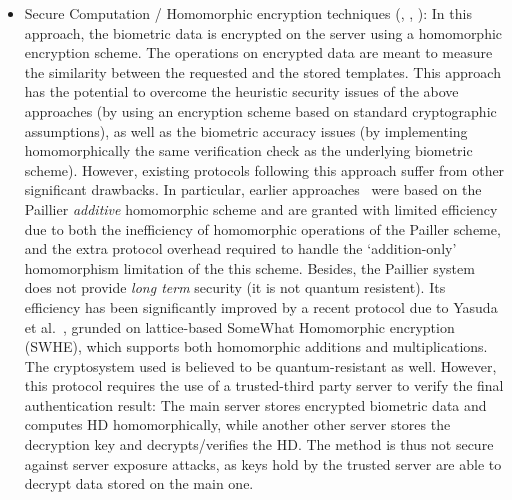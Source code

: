 \begin{itemize}
\item Secure Computation / Homomorphic encryption techniques
    (\cite{yasuda2014practical}, \cite{shahandashti2012private},
    \cite{higo2015privacy}): In this approach, the biometric data is encrypted
    on the server using a homomorphic encryption scheme. The operations on
    encrypted data are meant to measure the similarity between the requested and the
    stored templates. This approach has the potential to overcome the heuristic
    security issues of the above approaches (by using an encryption scheme based
    on standard cryptographic assumptions), as well as the biometric accuracy
    issues (by implementing homomorphically the same verification check as the
    underlying biometric scheme). However, existing protocols following this
    approach suffer from other significant drawbacks. In particular, earlier
    approaches~\cite{shahandashti2012private} were based on the Paillier
    \emph{additive} homomorphic scheme and are granted with limited efficiency due to
    both the inefficiency of homomorphic operations of the Pailler scheme, and
    the extra protocol overhead required to handle the `addition-only'
    homomorphism limitation of the this scheme. Besides, the Paillier system
    does not provide \emph{long term} security (it is not quantum resistent).
    Its efficiency has been
    significantly improved by a recent protocol due to Yasuda et
    al.~\cite{yasuda2014practical}, grunded on lattice-based SomeWhat Homomorphic
    encryption (SWHE), which supports both homomorphic additions and multiplications.
    The cryptosystem used is believed to be quantum-resistant as
    well.
    However, this protocol requires the use of a trusted-third party server to
    verify the final authentication result: The main server stores encrypted
    biometric data and computes HD homomorphically, while another other server stores the
    decryption key and decrypts/verifies the HD.
    The method is thus not secure against
    server exposure attacks, as keys hold by the trusted server are able to decrypt data stored on the
    main one.
  \end{itemize}


